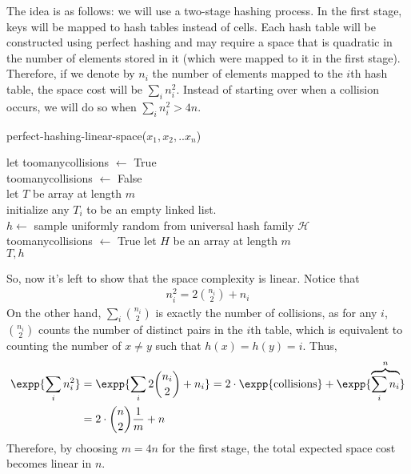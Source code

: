 The idea is as follows: we will use a two-stage hashing process. In the first stage, keys will be mapped to hash tables instead of cells. Each hash table will be constructed using perfect hashing and may require a space that is quadratic in the number of elements stored in it (which were mapped to it in the first stage). Therefore, if we denote by $n_{i}$ the number of elements mapped to the $i$th hash table, the space cost will be $\sum_{i}n_{i}^{2}$. Instead of starting over when a collision occurs, we will do so when $\sum_{i}n_{i}^{2} > 4n$.
  \begin{algorithm}
  \caption{perfect-hashing-linear-space($x_{1},x_{2},..x_{n}$)}
  let toomanycollisions $\leftarrow$ True\\
   {
    toomanycollisions $\leftarrow$ False\\
    let $T$ be array at length $m$ \\
    initialize any $T_{i}$ to be an empty linked list. \\ 
    $h \leftarrow $ sample uniformly random from universal hash family $\mathcal{H}$\\
     {
       toomanycollisions $\leftarrow$ True
     }
  }
  let $H$ be an array at length $m$\\
  \Return $T,h$

  \end{algorithm}
  So, now it's left to show that the space complexity is linear. Notice that
  \begin{equation*}
    \begin{split}
      n_{i}^{2}= 2{ n_{i} \choose 2 } + n_{i}
    \end{split}
  \end{equation*}
On the other hand, $\sum_{i}{ n_{i}\choose 2  }$ is exactly the number of collisions, as for any $i$, ${ n_{i} \choose 2 }$ counts the number of distinct pairs in the $i$th table, which is equivalent to counting the number of $x\neq y$ such that $h(x) = h(y) = i$. Thus,
  \begin{equation*}
    \begin{split}
      \expp{\sum_{i}n^{2}_{i}} &= \expp{\sum_{i} {2{ n_{i} \choose 2 } + n_{i}}}= 2\cdot \expp{\text{collisions}} + \expp{\overbrace{\sum_{i}{n_i}}^{n}}\\
      &= 2 \cdot { n \choose 2} \frac{1}{m} + n
    \end{split}
  \end{equation*}
  Therefore, by choosing $m = 4n$ for the first stage, the total expected space cost becomes linear in $n$.

